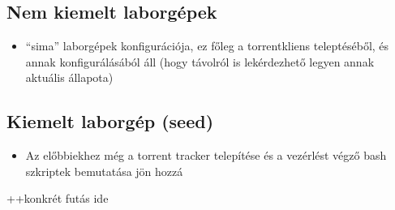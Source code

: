%
\subsection{Nem kiemelt laborgépek}
%

\begin{itemize}
  \item ``sima'' laborgépek konfigurációja, ez főleg a torrentkliens teleptéséből, és annak konfigurálásából áll (hogy távolról is lekérdezhető legyen annak aktuális állapota)
\end{itemize}

%
\subsection{Kiemelt laborgép (seed)}
%

\begin{itemize}
  \item Az előbbiekhez még a torrent tracker telepítése és a vezérlést végző bash szkriptek bemutatása jön hozzá
\end{itemize}

++konkrét futás ide

